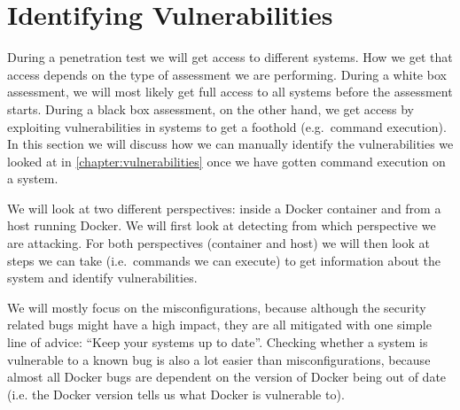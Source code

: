 \section{Identifying Vulnerabilities}
During a penetration test we will get access to different systems. How we get that access depends on the type of assessment we are performing. During a white box assessment, we will most likely get full access to all systems before the assessment starts. During a black box assessment, on the other hand, we get access by exploiting vulnerabilities in systems to get a foothold (e.g.\ command execution). In this section we will discuss how we can manually identify the vulnerabilities we looked at in \autoref{chapter:vulnerabilities} once we have gotten command execution on a system.

We will look at two different perspectives: inside a Docker container and from a host running Docker. We will first look at detecting from which perspective we are attacking. For both perspectives (container and host) we will then look at steps we can take (i.e.\ commands we can execute) to get information about the system and identify vulnerabilities.

\hfill

We will mostly focus on the misconfigurations, because although the security related bugs might have a high impact, they are all mitigated with one simple line of advice: ``Keep your systems up to date''. Checking whether a system is vulnerable to a known bug is also a lot easier than misconfigurations, because almost all Docker bugs are dependent on the version of Docker being out of date (i.e. the Docker version tells us what Docker is vulnerable to).





